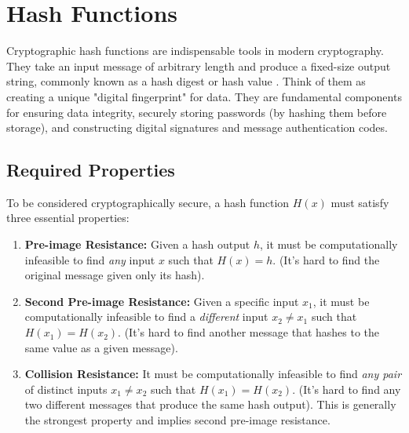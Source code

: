 
\section{Hash Functions}\label{sec:hash_functions_ch3}

Cryptographic hash functions are indispensable tools in modern cryptography. They take an input message of arbitrary length and produce a fixed-size output string, commonly known as a hash digest or hash value \parencite{menezes1996handbook}. Think of them as creating a unique "digital fingerprint" for data. They are fundamental components for ensuring data integrity, securely storing passwords (by hashing them before storage), and constructing digital signatures and message authentication codes.

\subsection{Required Properties}
To be considered cryptographically secure, a hash function $H(x)$ must satisfy three essential properties:
\begin{enumerate}
    \item \textbf{Pre-image Resistance:} Given a hash output $h$, it must be computationally infeasible to find \textit{any} input $x$ such that $H(x)=h$. (It's hard to find the original message given only its hash).
    \item \textbf{Second Pre-image Resistance:} Given a specific input $x_1$, it must be computationally infeasible to find a \textit{different} input $x_2 \neq x_1$ such that $H(x_1) = H(x_2)$. (It's hard to find another message that hashes to the same value as a given message).
    \item \textbf{Collision Resistance:} It must be computationally infeasible to find \textit{any pair} of distinct inputs $x_1 \neq x_2$ such that $H(x_1) = H(x_2)$. (It's hard to find any two different messages that produce the same hash output). This is generally the strongest property and implies second pre-image resistance.
\end{enumerate}

